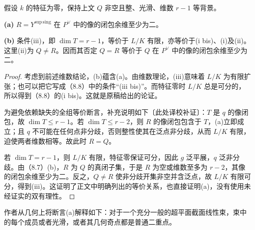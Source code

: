 假设 $k$ 的特征为零，保持上文 $Q$ 非空且整、光滑、维数 $r-1$ 等背景。

\noindent\textbf{(a)} $R={Y^{\mathrm{sup\,sing}}}$ 在 $P^\vee$ 中的像的闭包余维至少为二。

\noindent\textbf{(b)} 条件(iii)，即 $\dim T=r-1$，等价于 $L/K$ 有限，亦等价于(i bis)、(i)及(ii)。这里(ii)为 $Q\ne R$。因而其否定 $Q=R$ 等价于 $Q$ 在 $P^\vee$ 中的像的闭包余维至少为二。

\begin{proof}
考虑到前述维数结论，(b)蕴含(a)。由维数理论，(iii)意味着 $L/K$ 为有限扩张；也可以把它写成（8.8）中的条件“(iii bis)”。而特征零时 $L/K$ 总是可分的，所以得到（8.8）的(i bis)。这就是原稿给出的论证。

为避免依赖缺失的全组等价断言，补充说明如下〔此处译校补证〕：$T$ 是 $q$ 的像闭包，故 $\dim T\leq r-1$。若 $\dim T\leq r-2$，则 $R$ 的像闭包包含于 $T$，(a)立即成立；且 $q$ 不可能在任何点非分歧，否则整性使其在泛点非分歧，从而 $L/K$ 有限，迫使两者维数相等。故此时 $R=Q$。

若 $\dim T=r-1$，则 $L/K$ 有限，特征零保证可分，因此 $g$ 泛平展，$q$ 泛非分歧。由（8.7）(b)，$R$ 为 $Q$ 的真闭子集，于是 $R$ 为空或维数至多为 $r-2$，其像的闭包余维至少为二。反之，$Q\ne R$ 使非分歧开集非空并含泛点，故 $L/K$ 有限可分，得到(iii)。这证明了正文中明确列出的等价关系，也直接证明(a)，没有使用未经证实的双有理性。
\end{proof}

作者从几何上将断言(a)解释如下：对于一个充分一般的超平面截面线性束，束中的每个成员或者光滑，或者其几何奇点都是普通二重点。

